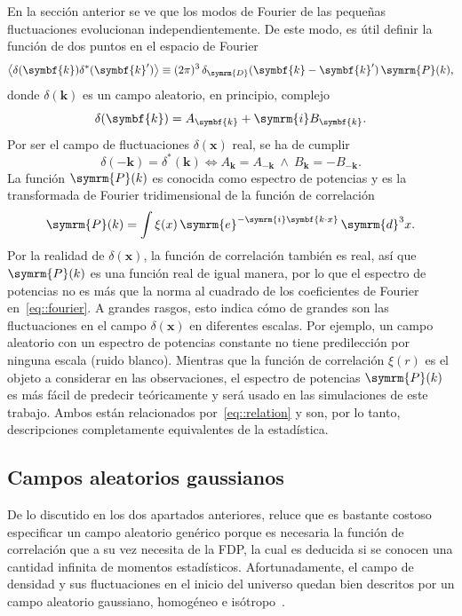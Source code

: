 En la sección anterior se ve que los modos de Fourier de las pequeñas fluctuaciones evolucionan independientemente. De este modo, es útil definir la función de dos puntos en el espacio de Fourier
\begin{equation}
    \left\langle\delta(\symbf{k})\delta^{*}(\symbf{k}')\right\rangle\equiv (2\pi)^3\,\delta_{\symrm{D}}(\symbf{k}-\symbf{k}')\,\symrm{P}(k),
\end{equation}
donde \(\delta(\symbf{k})\) es un campo aleatorio, en principio, complejo
\begin{equation}
    \delta(\symbf{k})=A_{\symbf{k}}+\symrm{i}B_{\symbf{k}}.\label{eq::deltak}
\end{equation}
Por ser el campo de fluctuaciones \(\delta(\symbf{x})\) real, se ha de cumplir
\begin{equation}
    \delta(\symbf{-k})=\delta^{*}(\symbf{k})\Longleftrightarrow A_{\symbf{k}}=A_{-{\symbf{k}}}\ \wedge\ B_{\symbf{k}}=-B_{-{\symbf{k}}}.\label{eq::reality}
\end{equation}
La función \(\symrm{P}(k)\) es conocida como espectro de potencias y es la transformada de Fourier tridimensional de la función de correlación
\begin{equation}
    \symrm{P}(k)=\int\xi(x)\,\symrm{e}^{-\symrm{i}\symbf{k\cdot x}}\,\symrm{d}^3x.\label{eq::relation}
\end{equation}
Por la realidad de \(\delta(\symbf{x})\), la función de correlación también	es real, así que \(\symrm{P}(k)\) es una función real de igual manera, por lo que el espectro de potencias no es más que la norma al cuadrado de los coeficientes de Fourier en~\eqref{eq::fourier}. A grandes rasgos, esto indica cómo de grandes son las fluctuaciones en el campo \(\delta(\symbf{x})\) en diferentes escalas. Por ejemplo, un campo aleatorio con un espectro de potencias constante no tiene predilección por ninguna escala (ruido blanco). Mientras que la función de correlación \(\xi(r)\) es el objeto a considerar en las observaciones, el espectro de potencias \(\symrm{P}(k)\) es más fácil de predecir teóricamente y será usado en las simulaciones de este trabajo. Ambos están relacionados por~\eqref{eq::relation} y son, por lo tanto, descripciones completamente equivalentes de la estadística.
\subsection{Campos aleatorios gaussianos}
De lo discutido en los dos apartados anteriores, reluce que es bastante costoso especificar un campo aleatorio genérico porque es necesaria la función de correlación que a su vez necesita de la FDP, la cual es deducida si se conocen una cantidad infinita de momentos estadísticos. Afortunadamente, el campo de densidad y sus fluctuaciones en el inicio del universo quedan bien descritos por un campo aleatorio gaussiano, homogéneo e isótropo~\cite{baumann2022cosmology, dodelson2020modern,mo_van}.

